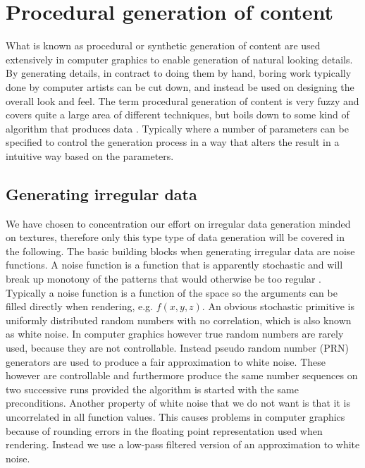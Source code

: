 
\chapter{Procedural generation of content}
\label{chap:noise}
What is known as procedural or synthetic generation of content are
used extensively in computer graphics to enable generation of natural
looking details. By generating details, in contract to doing them by
hand, boring work typically done by computer artists can be cut down,
and instead be used on designing the overall look and feel.
%
The term procedural generation of content is very fuzzy and covers
quite a large area of different techniques, but boils down to some
kind of algorithm that produces data .
Typically where a number of parameters can be specified to control the
generation process in a way that alters the result in a intuitive way
based on the parameters.

\section{Generating irregular data}
We have chosen to concentration our effort on irregular data generation
minded on textures, therefore only this type type of data generation
will be covered in the following.
%
The basic building blocks when generating irregular data are
noise functions. A noise function is a function that is apparently
stochastic and will break up monotony of the patterns that would
otherwise be too regular .
%
Typically a noise function is a function of the space so the arguments
can be filled directly when rendering, e.g. $f(x,y,z)$.
%
An obvious stochastic primitive is uniformly distributed random
numbers with no correlation, which is also known as white noise.
In computer graphics however true random numbers are rarely used,
because they are not controllable.
Instead pseudo random number (PRN) generators are used to produce a
fair approximation to white noise. These however are controllable and
furthermore produce the same number sequences on two successive runs
provided the algorithm is started with the same preconditions.
%
Another property of white noise that we do not want is that it is
uncorrelated in all function values. This causes problems in computer
graphics because of rounding errors in the floating point
representation used when rendering. Instead we use a low-pass filtered
version of an approximation to white noise.

